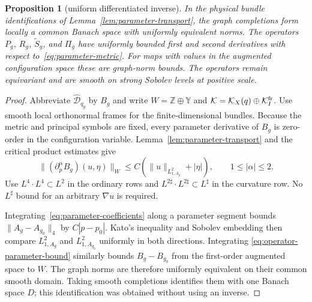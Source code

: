 \documentclass[11pt]{amsart}
\newtheorem{proposition}[theorem]{Proposition}
\theoremstyle{definition}
\theoremstyle{remark}
\theoremstyle{plain}
\newcommand{\cK}{\mathcal{K}}
\begin{document}
\begin{proposition}[uniform differentiated inverse]\label{prop:uniform-derivatives}
In the physical bundle identifications of
Lemma~\ref{lem:parameter-transport}, the graph completions form locally
a common Banach space with uniformly equivalent norms.  The operators
$P_g$, $R_g$, $\widetilde S_g$, and $\Pi_g$ have uniformly bounded first
and second derivatives with respect to~\eqref{eq:parameter-metric}.
For maps with values in the augmented configuration space these are
graph-norm bounds.  The operators remain equivariant and are smooth on
strong Sobolev levels at positive scale.
\end{proposition}

\begin{proof}
Abbreviate $\widehat{\mathscr D}_{q_g}$ by $B_g$ and write
$W=\mathbb Z\oplus\mathbb Y$ and
$\cK=\cK_X(q)\oplus\cK_I^{\rm fr}$.  Use smooth local orthonormal
frames for the finite-dimensional bundles.  Because the metric and
principal symbols are fixed, every parameter derivative of $B_g$ is
zero-order in the configuration variable.  Lemma~\ref{lem:parameter-transport}
and the critical product estimates give
\begin{equation}\label{eq:operator-parameter-bound}
 \|(\partial_p^\alpha B_g)(u,\eta)\|_W
 \leq C(\|u\|_{L^2_{1,A_g}}+|\eta|),\qquad 1\leq|\alpha|\leq2.
\end{equation}
Use $L^4\cdot L^4\subset L^2$ in the ordinary rows and
$L^{2\sharp}\cdot L^{2\sharp}\subset L^\sharp$ in the curvature row.
No $L^\sharp$ bound for an arbitrary $\nabla u$ is required.

Integrating~\eqref{eq:parameter-coefficients} along a parameter segment
bounds $\|A_g-A_{g_0}\|_4$ by $C|p-p_0|$.  Kato's inequality and
Sobolev embedding then compare $L^2_{1,A_g}$ and $L^2_{1,A_{g_0}}$
uniformly in both directions.  Integrating
\eqref{eq:operator-parameter-bound} similarly bounds $B_g-B_{g_0}$
from the first-order augmented space to $W$.
The graph norms are therefore uniformly equivalent on their common
smooth domain.  Taking smooth completions identifies them with one
Banach space $D$; this identification was obtained without using an inverse.


\end{proof}
\end{document}
